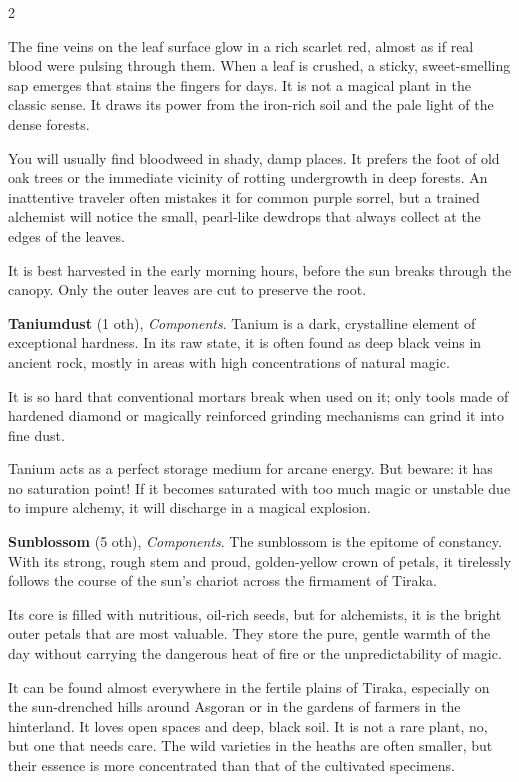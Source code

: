\begin{multicols}{2}
\begin{denseitemize}
The fine veins on the leaf surface glow in a rich scarlet red, almost as if real blood were pulsing through them. When a leaf is crushed, a sticky, sweet-smelling sap emerges that stains the fingers for days. It is not a magical plant in the classic sense. It draws its power from the iron-rich soil and the pale light of the dense forests.

You will usually find bloodweed in shady, damp places. It prefers the foot of old oak trees or the immediate vicinity of rotting undergrowth in deep forests. An inattentive traveler often mistakes it for common purple sorrel, but a trained alchemist will notice the small, pearl-like dewdrops that always collect at the edges of the leaves.

It is best harvested in the early morning hours, before the sun breaks through the canopy. Only the outer leaves are cut to preserve the root.
        \item \textbf{Taniumdust} (1 oth), \textit{Components}.
        Tanium is a dark, crystalline element of exceptional hardness. In its raw state, it is often found as deep black veins in ancient rock, mostly in areas with high concentrations of natural magic. 

It is so hard that conventional mortars break when used on it; only tools made of hardened diamond or magically reinforced grinding mechanisms can grind it into fine dust.

Tanium acts as a perfect storage medium for arcane energy. But beware: it has no saturation point! If it becomes saturated with too much magic or unstable due to impure alchemy, it will discharge in a magical explosion.
        \item \textbf{Sunblossom} (5 oth), \textit{Components}.
        The sunblossom is the epitome of constancy. With its strong, rough stem and proud, golden-yellow crown of petals, it tirelessly follows the course of the sun's chariot across the firmament of Tiraka.

Its core is filled with nutritious, oil-rich seeds, but for alchemists, it is the bright outer petals that are most valuable. They store the pure, gentle warmth of the day without carrying the dangerous heat of fire or the unpredictability of magic.

It can be found almost everywhere in the fertile plains of Tiraka, especially on the sun-drenched hills around Asgoran or in the gardens of farmers in the hinterland. It loves open spaces and deep, black soil. It is not a rare plant, no, but one that needs care. The wild varieties in the heaths are often smaller, but their essence is more concentrated than that of the cultivated specimens.


\end{denseitemize}
\end{multicols}
